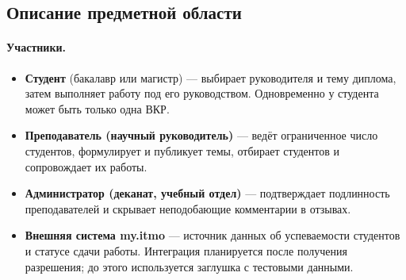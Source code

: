\documentclass[a4paper,12pt]{article}
\begin{document}
\subsection{Описание предметной области}

\paragraph{Участники.}
\begin{itemize}
  \item \textbf{Студент} (бакалавр или магистр) — выбирает руководителя и тему диплома, затем выполняет работу под его руководством. Одновременно у студента может быть только одна ВКР.
  \item \textbf{Преподаватель (научный руководитель)} — ведёт ограниченное число студентов, формулирует и публикует темы, отбирает студентов и сопровождает их работы.
  \item \textbf{Администратор (деканат, учебный отдел)} — подтверждает подлинность преподавателей и скрывает неподобающие комментарии в отзывах.
  \item \textbf{Внешняя система my.itmo} — источник данных об успеваемости студентов и статусе сдачи работы. Интеграция планируется после получения разрешения; до этого используется заглушка с тестовыми данными.
\end{itemize}
\end{document}
